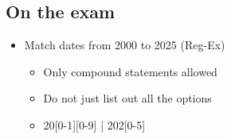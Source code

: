 \documentclass[11pt]{article}
\theoremstyle{definition}
\begin{document}
\subsection{On the exam}
\begin{itemize}
  \item Match dates from 2000 to 2025 (Reg-Ex)
  \begin{itemize}
    \item Only compound statements allowed
    \item Do not just list out all the options
    \item 20[0-1][0-9] | 202[0-5]
  \end{itemize}
\end{itemize}
\end{document}
